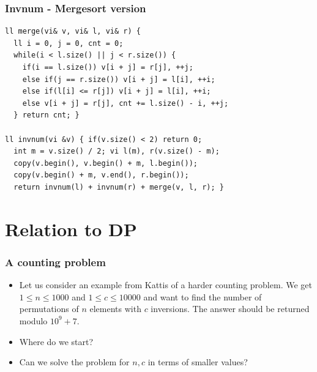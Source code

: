 \documentclass{beamer}
\begin{document}
\begin{frame}
\frametitle{Invnum - Mergesort version}

\begin{small}
\begin{verbatim}
ll merge(vi& v, vi& l, vi& r) {
  ll i = 0, j = 0, cnt = 0;
  while(i < l.size() || j < r.size()) {
    if(i == l.size()) v[i + j] = r[j], ++j;
    else if(j == r.size()) v[i + j] = l[i], ++i;
    else if(l[i] <= r[j]) v[i + j] = l[i], ++i;
    else v[i + j] = r[j], cnt += l.size() - i, ++j;
  } return cnt; }

ll invnum(vi &v) { if(v.size() < 2) return 0;
  int m = v.size() / 2; vi l(m), r(v.size() - m);
  copy(v.begin(), v.begin() + m, l.begin());
  copy(v.begin() + m, v.end(), r.begin());
  return invnum(l) + invnum(r) + merge(v, l, r); }
\end{verbatim}
\end{small}

\end{frame}

\section*{Relation to DP}

\begin{frame}[plain]
\frametitle{A counting problem}

\begin{itemize}

\item Let us consider an example from Kattis of a harder counting problem. We get $1 \leq n \leq 1000$ and $1 \leq c \leq 10000$ and want to find the number of permutations of $n$ elements with $c$ inversions. The answer should be returned modulo $10^9 + 7$.

\item Where do we start?

\item Can we solve the problem for $n, c$ in terms of smaller values?

\end{itemize}

\end{frame}
\end{document}
